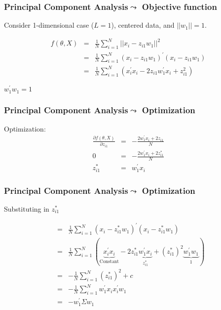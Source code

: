 \begin{frame}[fragile]
\frametitle{Principal Component Analysis$\leadsto$ Objective function}

Consider 1-dimensional case ($L = 1$), centered data, and $||{w}_{1}|| = 1$.  

\begin{eqnarray}
f({\theta},  {X}) & = & \frac{1}{N} \sum_{i=1}^{N} ||{x}_{i} - z_{i1}{w}_{1} ||^2     \nonumber \\
& = & \frac{1}{N} \sum_{i=1}^{N} ({x}_{i}  - z_{i1} {w}_{1} )^{'}({x}_{i}  - z_{i1} {w}_{1} ) \nonumber   \\
& = & \frac{1}{N}\sum_{i=1}^{N}\left({x}_{i}^{'}{x}_{i} - 2 z_{i1}{w}_{1}^{'}{x}_{i} + z_{i1}^{2} \right ) \nonumber  
\end{eqnarray}

${w}_{1}^{'}{w}_{1} = 1$ 
\end{frame}

\begin{frame}[fragile]
\frametitle{Principal Component Analysis$\leadsto$ Optimization}


Optimization:  
\begin{eqnarray}
\frac{\partial f({\theta}, {X})}{\partial z_{i1}}  & = &  - \frac{2 {w}_{1}^{'} {x}_{i} + 2 z_{i1}}{N} \nonumber \\
0 & = & - \frac{2 {w}_{1}^{'} {x}_{i} + 2 z_{i1}^{*}}{N} \nonumber \\  
z_{i1}^{*} & = & {w}_{1}^{'} {x}_{i} \nonumber 
\end{eqnarray}



\end{frame}





\begin{frame}[fragile]
\frametitle{Principal Component Analysis$\leadsto$ Optimization}
Substituting in $z_{i1}^{*}$  

\begin{eqnarray}
& = & \frac{1}{N} \sum_{i=1}^{N} ({x}_{i}  - z_{i1}^{*} {w}_{1} )^{'}({x}_{i}  - z_{i1}^{*} {w}_{1} ) \nonumber   \\
 & = & \frac{1}{N} \sum_{i=1}^{N} (\underbrace{{x}_{i}^{'}{x}_{i}}_{\text{Constant}}  - 2 z_{i1}^{*} \underbrace{{w}_{1}^{'}{x}_{i}}_{z_{i1}^{*}}  + \left(z_{i1}^{*}\right)^{2} \underbrace{{w}_{1}^{'}{w}_{1}}_{1} )   \nonumber   \\
 & = &  - \frac{1}{N} \sum_{i=1}^{N}   \left(z_{i1}^{*}\right)^{2} + c \nonumber   \\
 & = & - \frac{1}{N} \sum_{i=1}^{N} {w}_{1}^{'}{x}_{i}{x}^{'}_{i}{w}_{1} \nonumber   \\
 & = & -  {w}_{1}^{'}{\Sigma} {w}_{1} \nonumber
\end{eqnarray}



\end{frame}

